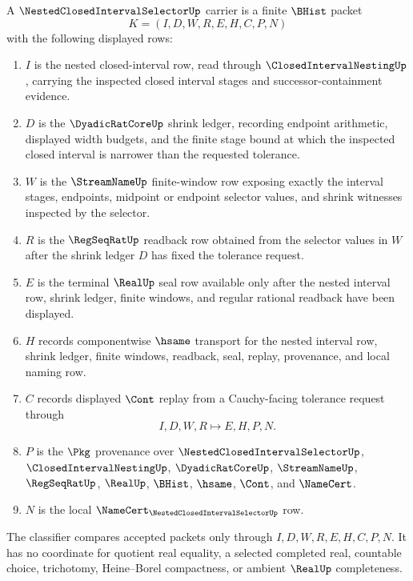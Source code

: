 \begin{definition}
\label{def:nested-closed-interval-selector-carrier}
A $\NestedClosedIntervalSelectorUp$ carrier is a finite $\BHist$ packet
$$
K=(I,D,W,R,E,H,C,P,N)
$$
with the following displayed rows:
\begin{enumerate}
\item $I$ is the nested closed-interval row, read through $\ClosedIntervalNestingUp$, carrying the inspected closed interval stages and successor-containment evidence.
\item $D$ is the $\DyadicRatCoreUp$ shrink ledger, recording endpoint arithmetic, displayed width budgets, and the finite stage bound at which the inspected closed interval is narrower than the requested tolerance.
\item $W$ is the $\StreamNameUp$ finite-window row exposing exactly the interval stages, endpoints, midpoint or endpoint selector values, and shrink witnesses inspected by the selector.
\item $R$ is the $\RegSeqRatUp$ readback row obtained from the selector values in $W$ after the shrink ledger $D$ has fixed the tolerance request.
\item $E$ is the terminal $\RealUp$ seal row available only after the nested interval row, shrink ledger, finite windows, and regular rational readback have been displayed.
\item $H$ records componentwise $\hsame$ transport for the nested interval row, shrink ledger, finite windows, readback, seal, replay, provenance, and local naming row.
\item $C$ records displayed $\Cont$ replay from a Cauchy-facing tolerance request through
$$
I,D,W,R \longmapsto E,H,P,N .
$$
\item $P$ is the $\Pkg$ provenance over $\NestedClosedIntervalSelectorUp$, $\ClosedIntervalNestingUp$, $\DyadicRatCoreUp$, $\StreamNameUp$, $\RegSeqRatUp$, $\RealUp$, $\BHist$, $\hsame$, $\Cont$, and $\NameCert$.
\item $N$ is the local $\NameCert_{\NestedClosedIntervalSelectorUp}$ row.
\end{enumerate}
The classifier compares accepted packets only through $I,D,W,R,E,H,C,P,N$. It has no coordinate for quotient real equality, a selected completed real, countable choice, trichotomy, Heine--Borel compactness, or ambient $\RealUp$ completeness.
\end{definition}

